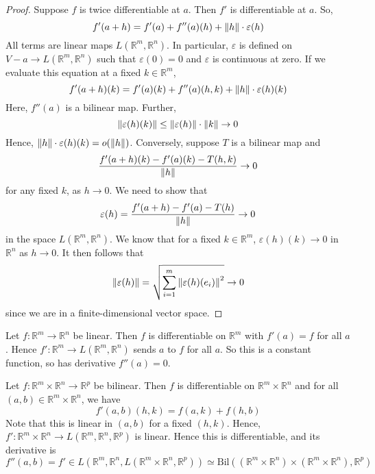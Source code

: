 \begin{proof}
	Suppose \( f \) is twice differentiable at \( a \).
	Then \( f' \) is differentiable at \( a \).
	So,
	\[
		f'(a+h) = f'(a) + f''(a)(h) + \norm{h} \cdot \varepsilon(h)
	\]
	All terms are linear maps \( L(\mathbb R^m, \mathbb R^n) \).
	In particular, \( \varepsilon \) is defined on \( V - a \to L(\mathbb R^m, \mathbb R^n) \) such that \( \varepsilon(0) = 0 \) and \( \varepsilon \) is continuous at zero.
	If we evaluate this equation at a fixed \( k \in \mathbb R^m \),
	\[
		f'(a+h)(k) = f'(a)(k) + f''(a)(h,k) + \norm{h} \cdot \varepsilon(h)(k)
	\]
	Here, \( f''(a) \) is a bilinear map.
	Further,
	\[
		\norm{\varepsilon(h)(k)} \leq \norm{\varepsilon(h)} \cdot \norm{k} \to 0
	\]
	Hence, \( \norm{h} \cdot \varepsilon(h)(k) = o\qty(\norm{h}) \).
	Conversely, suppose \( T \) is a bilinear map and
	\[
		\frac{f'(a+h)(k) - f'(a)(k) - T(h,k)}{\norm{h}} \to 0
	\]
	for any fixed \( k \), as \( h \to 0 \).
	We need to show that
	\[
		\varepsilon(h) = \frac{f'(a+h) - f'(a) - T(h)}{\norm{h}} \to 0
	\]
	in the space \( L(\mathbb R^m, \mathbb R^n) \).
	We know that for a fixed \( k \in \mathbb R^m \), \( \varepsilon(h)(k) \to 0 \) in \( \mathbb R^n \) as \( h \to 0 \).
	It then follows that
	\[
		\norm{\varepsilon(h)} = \sqrt{\sum_{i=1}^m \norm{\varepsilon(h)(e_i)}^2} \to 0
	\]
	since we are in a finite-dimensional vector space.
\end{proof}
\begin{example}
	Let \( f \colon \mathbb R^m \to \mathbb R^n \) be linear.
	Then \( f \) is differentiable on \( \mathbb R^m \) with \( f'(a) = f \) for all \( a \).
	Hence \( f' \colon \mathbb R^m \to L(\mathbb R^m, \mathbb R^n) \) sends \( a \) to \( f \) for all \( a \).
	So this is a constant function, so has derivative \( f''(a) = 0 \).
\end{example}
\begin{example}
	Let \( f \colon \mathbb R^m \times \mathbb R^n \to \mathbb R^p \) be bilinear.
	Then \( f \) is differentiable on \( \mathbb R^m \times \mathbb R^n \) and for all \( (a,b) \in \mathbb R^m \times \mathbb R^n \), we have
	\[
		f'(a,b)(h,k) = f(a,k) + f(h,b)
	\]
	Note that this is linear in \( (a,b) \) for a fixed \( (h,k) \).
	Hence, \( f' \colon \mathbb R^m \times \mathbb R^n \to L(\mathbb R^m, \mathbb R^n, \mathbb R^p) \) is linear.
	Hence this is differentiable, and its derivative is
	\[
		f''(a,b) = f' \in L(\mathbb R^m, \mathbb R^n, L(\mathbb R^m \times \mathbb R^n, \mathbb R^p)) \simeq \mathrm{Bil}((\mathbb R^m \times \mathbb R^n) \times (\mathbb R^m \times \mathbb R^n), \mathbb R^p)
	\]
\end{example}
